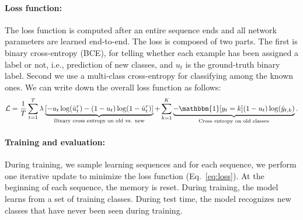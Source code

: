 \paragraph{Loss function:}
The loss function is computed after an entire sequence ends and all network parameters are learned
end-to-end. The loss is composed of two parts. The first is binary cross-entropy (BCE), for telling
whether each example has been assigned a label or not, i.e., prediction of new classes, and $u_t$ is the ground-truth binary label. Second we
use a multi-class cross-entropy for classifying among the known ones. We can write down the overall
loss function as follows:
\vskip -0.5cm
\begin{align}
\cL = \frac{1}{T} \sum_{t=1}^{T}
  \lambda \underbrace{ \left[ 
- u_t \log(\hat{u}_t^r) 
- (1-u_t) \log(1 - \hat{u}_t^r)  
\right]}_{\text{Binary cross entropy on old vs. new}}
+ \sum_{k=1}^{K} \underbrace{-\mathbbm{1}[y_t = k] (1-u_t) \log(\hat{y}_{t,k})}_{\text{Cross entropy on old classes}}
.
\label{eq:loss}
\end{align}

\vspace{-0.1in}
\paragraph{Training and evaluation:} During training, we sample learning sequences and for each sequence, we perform one iterative update to minimize the loss function (Eq.~\ref{eq:loss}). At the beginning of each sequence, the memory is reset. During training, the model learns from a set of training classes. During test time, the model recognizes new classes that have never been seen during training.